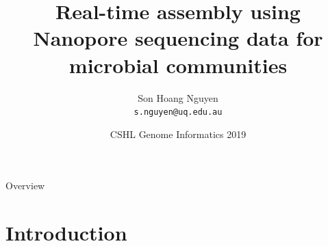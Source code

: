 \documentclass{beamer}
\title[Real-time assembly \& analysis for microbial genomes]
{
Real-time assembly using Nanopore sequencing data for microbial communities
}
\author[Son Hoang Nguyen, The University of Queensland]{Son Hoang Nguyen \\ \footnotesize{\texttt{s.nguyen@uq.edu.au}}
}
\date{CSHL Genome Informatics 2019}
\institute[IMB,UQ]{\large{Institute for Molecular Bioscience \\ The University of Queensland}}
\begin{document}
\begin{frame}
   \titlepage
\end{frame}
\begin{frame}{Overview}
 \tableofcontents
\end{frame}
\section{Introduction}
\end{document}

